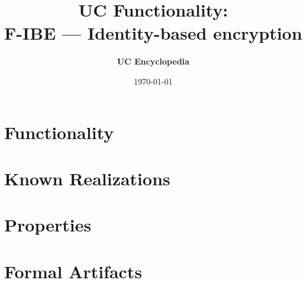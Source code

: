 \documentclass[11pt,a4paper]{article}
\title{\textbf{\Large UC Functionality:}\\[0.2em] \Large F-IBE --- Identity-based encryption}
\author{\textbf{UC Encyclopedia}}
\date{\today}
\newtheorem{functionality}{Functionality}
\begin{document}
\maketitle

\begin{abstract}
\end{abstract}

\section{Functionality}

%

\section{Known Realizations}


\section{Properties}


\section{Formal Artifacts}

\end{document}
